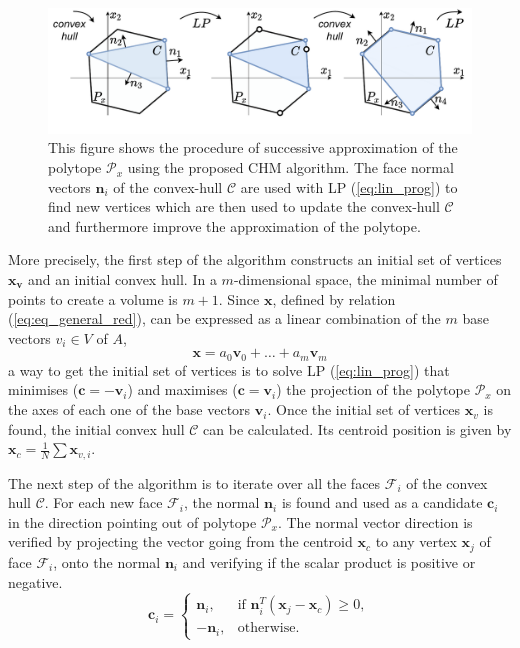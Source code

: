 \begin{figure}[!t]
    \centering
    \includegraphics[width=\linewidth]{Papers/images/poly_lp_vert_part.pdf}
    \vspace{-0.8cm}
    \caption{This figure shows the procedure of successive approximation of the polytope $\mathcal{P}_x$ using the proposed CHM algorithm. The face normal vectors $\bm{n}_i$ of the convex-hull $\mathcal{C}$ are used with LP (\ref{eq:lin_prog}) to find new vertices which are then used to update the convex-hull $\mathcal{C}$ and furthermore improve the approximation of the polytope. }
    \label{fig:algo_example}
\end{figure}




More precisely, the first step of the algorithm constructs an initial set of vertices $\bm{x_v}$ and an initial convex hull. In a $m$-dimensional space, the minimal number of points to create a volume is $m\!+\!1$. Since $\bm{x}$, defined by relation (\ref{eq:eq_general_red}), can be expressed as a linear combination of the $m$ base vectors $v_i\in V$ of $A$, $$\bm{x} = a_0 \bm{v}_0 + \dots +a_m \bm{v}_m$$ a way to get the initial set of vertices is to solve LP (\ref{eq:lin_prog}) that minimises ($\bm{c} = -\bm{v}_i$) and maximises ($\bm{c} = \bm{v}_i$) the projection of the polytope $\mathcal{P}_x$ on the axes of each one of the base vectors $\bm{v}_i$. Once the initial set of vertices $\bm{x}_v$ is found, the initial convex hull $\mathcal{C}$ can be calculated. Its centroid position is given by $\bm{x}_c\!=\!\frac{1}{N}\!\sum\bm{x}_{v,i}$. 

The next step of the algorithm is to iterate over all the faces $\mathcal{F}_i$ of the convex hull $\mathcal{C}$. For each new face $\mathcal{F}_i$, the normal $\bm{n}_i$ is found and used as a candidate $\bm{c}_i$ in the direction pointing out of polytope $\mathcal{P}_x$.
The normal vector direction is verified by projecting the vector going from the centroid $\bm{x}_c$ to any vertex $\bm{x}_{j}$ of face $\mathcal{F}_i$, onto the normal $\bm{n}_i$ and verifying if the scalar product is positive or negative.
\begin{equation}
    \bm{c}_i = \begin{cases}
  \bm{n}_i, & \text{if } \bm{n}_i^T(\bm{x}_{j} - \bm{x}_c) \geq 0, \\
  -\bm{n}_i, & \text{otherwise}.
\end{cases} 
\label{eq:normal_condition}
\end{equation}

